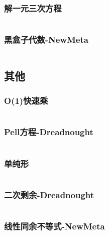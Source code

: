 \subsubsection{解一元三次方程}
\inputminted[breaklines]{cpp}{math/algebra/cubic-equation.cpp}
\subsubsection{黑盒子代数-NewMeta}
\inputminted[breaklines]{cpp}{math/algebra/black-box-algebra-NewMeta.cpp}

\subsection{其他}
\subsubsection{O(1)快速乘}
\inputminted[breaklines]{cpp}{math/fast-multiply.cpp}
\subsubsection{Pell方程-Dreadnought}
\inputminted[breaklines]{cpp}{math/pell-equation-Dreadnought.cpp}
\subsubsection{单纯形}
\inputminted[breaklines]{cpp}{math/simplex.cpp}
\subsubsection{二次剩余-Dreadnought}
\inputminted[breaklines]{cpp}{math/secondary-surplus-Dreadnought.cpp}
\subsubsection{线性同余不等式-NewMeta}
\inputminted[breaklines]{cpp}{math/linear-congruence-NewMeta.cpp}
